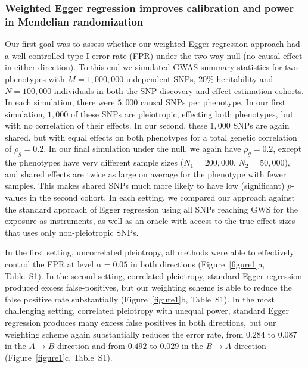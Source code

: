 \documentclass{article}
\begin{document}
\subsubsection*{Weighted Egger regression improves calibration and power in Mendelian randomization}
Our first goal was to assess whether our weighted Egger regression approach
had a well-controlled type-I error rate (FPR) under the two-way null (no causal effect in either direction). To this
end we simulated GWAS summary statistics for two phenotypes with $M=1,000,000$
independent SNPs, $20\%$ heritability and $N = 100,000$ individuals in both
 the SNP discovery and effect estimation cohorts. In each simulation, there
 were $5,000$ causal
SNPs per phenotype. In our first simulation, $1,000$ of these SNPs are pleiotropic,
effecting both phenotypes, but with no correlation of their effects. In our
second, these $1,000$ SNPs are again shared, but with equal effects on both phenotypes
for a total genetic correlation of $\rho_g = 0.2$. In our final simulation under the
null, we again have $\rho_g = 0.2$, except the phenotypes have very different sample sizes
($N_1 = 200,000$, $N_2 = 50,000$), and shared effects are twice as large on average
for the phenotype with fewer samples. This makes shared SNPs much more likely to have
low (significant) $p$-values in the second cohort. In each setting, we compared our approach
against the standard approach of Egger regression using all SNPs reaching GWS for
 the exposure as instruments, as well as an oracle with access to the true
effect sizes that uses only non-pleiotropic SNPs.

In the first setting, uncorrelated pleiotropy, all methods were able to 
effectively control the FPR at level $\alpha = 0.05$ in both directions
(Figure~\ref{figure1}a, Table~S1).
In the second setting, correlated pleiotropy,
standard Egger regression produced excess false-positives, but our weighting
scheme is able to reduce the false positive rate substantially
(Figure~\ref{figure1}b, Table~S1).  In the most challenging setting,
correlated pleiotropy with unequal power, standard Egger regression produces
many excess false positives in both directions, but our weighting scheme
again substantially reduces the error rate, from $0.284$ to $0.087$ in
the $A\rightarrow B$ direction and from $0.492$ to $0.029$ in the 
$B\rightarrow A$ direction (Figure~\ref{figure1}c, Table~S1).
\end{document}
